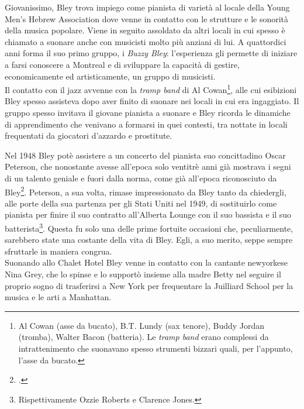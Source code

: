 Giovanissimo, Bley trova impiego come pianista di varietà al locale della Young Men's Hebrew Association dove venne in contatto con le strutture e le sonorità della musica popolare. Viene in seguito assoldato da altri locali in cui spesso è chiamato a suonare anche con musicisti molto più anziani di lui.
A quattordici anni forma il suo primo gruppo, i \textit{Buzzy Bley}: l'esperienza gli permette di iniziare a farsi conoscere a Montreal e di sviluppare la capacità di gestire, economicamente ed artisticamente, un gruppo di musicisti. \\
Il contatto con il jazz avvenne con la \textit{tramp band} di Al Cowan\footnote{Al Cowan (asse da bucato), B.T. Lundy (sax tenore), Buddy Jordan (tromba), Walter Bacon (batteria). Le \textit{tramp band} erano complessi da intrattenimento che suonavano spesso strumenti bizzari quali, per l'appunto, l'asse da bucato.}, alle cui esibizioni Bley spesso assisteva dopo aver finito di suonare nei locali in cui era ingaggiato. Il gruppo spesso invitava il giovane pianista a suonare e Bley ricorda le dinamiche di apprendimento che venivano a formarsi in quei contesti, tra nottate in locali frequentati da giocatori d'azzardo e prostitute.\par
Nel 1948 Bley potè assistere a un concerto del pianista suo concittadino Oscar Peterson, che nonostante avesse all'epoca solo ventitrè anni già mostrava i segni di un talento geniale e fuori dalla norma, come già all'epoca riconosciuto da Bley\footcite[20]{stopping}. Peterson, a sua volta, rimase impressionato da Bley tanto da chiedergli, alle porte della sua partenza per gli Stati Uniti nel 1949, di sostituirlo come pianista per finire il suo contratto all'Alberta Lounge con il suo bassista e il suo batterista\footnote{Rispettivamente Ozzie Roberts e Clarence Jones.}. Questa fu solo una delle prime fortuite occasioni che, peculiarmente, sarebbero state una costante della vita di Bley. Egli, a suo merito, seppe sempre sfruttarle in maniera congrua.\\
Suonando allo Chalet Hotel Bley venne in contatto con la cantante newyorkese Nina Grey, che lo spinse e lo supportò insieme alla madre Betty nel seguire il proprio sogno di trasferirsi a New York per frequentare la Juilliard School per la musica e le arti a Manhattan. \par
